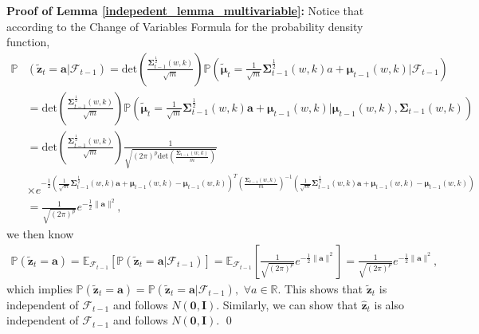 \noindent
\textbf{Proof of Lemma \ref{indepedent_lemma_multivariable}:}
    Notice that according to the Change of Variables Formula for the probability density function,
\begin{align*}
\mathbb{P}&(\widetilde{\bm{z}}_t=\bm{a}|\mathcal{F}_{t-1})=\text{det}\left(\frac{\bm{\Sigma}^{\frac{1}{2}}_{t-1}(w,k)}{\sqrt{m}}\right)\mathbb{P}\left(\widetilde{\bm{\mu}}_t =\frac{1}{\sqrt{m}}\bm{\Sigma}^{\frac{1}{2}}_{t-1}(w,k)a+\bm{\mu}_{t-1}(w,k)|\mathcal{F}_{t-1}\right)\\&= \text{det}\left(\frac{\bm{\Sigma}^{\frac{1}{2}}_{t-1}(w,k)}{\sqrt{m}}\right) \mathbb{P}\left(
\widetilde{\bm{\mu}}_t =\frac{1}{\sqrt{m}}\bm{\Sigma}^{\frac{1}{2}}_{t-1}(w,k)\bm a+\bm{\mu}_{t-1}(w,k)|\bm{\mu}_{t-1}(w,k),\bm{\Sigma}_{t-1}(w,k)
\right) \\&=\text{det}\left(\frac{\bm{\Sigma}^{\frac{1}{2}}_{t-1}(w,k)}{\sqrt{m}}\right)
\frac{1}{\sqrt
{{(2\pi)}^p \text{det}\left(\frac{\bm{\Sigma}_{t-1}(w,k)}{m}\right) }
} \\& \times e^{-\frac{1}{2}   ( \frac{1}{\sqrt{m}}\bm{\Sigma}^{\frac{1}{2}}_{t-1}(w,k)\bm a+\bm{\mu}_{t-1}(w,k)   -\bm{\mu}_{t-1}(w,k)   )^T {(\frac{\bm{\Sigma}_{t-1}(w,k)}{m})}^{-1} ( \frac{1}{\sqrt{m}}\bm{\Sigma}^{\frac{1}{2}}_{t-1}(w,k)\bm{a}+\bm{\mu}_{t-1}(w,k)   -\bm{\mu}_{t-1}(w,k)   )    } \\ & =\frac{1}{\sqrt{{(2\pi)}^p}}e^{-\frac{1}{2}\|\bm a\|^2},
\end{align*}
we then know 
\begin{align}
\mathbb{P}(\widetilde{\bm z}_t=\bm{a})=\mathbb{E}_{\mathcal{F}_{t-1}}\left[\mathbb{P}(\widetilde{\bm z}_t=\bm{a} | \mathcal{F}_{t-1})\right]=\mathbb{E}_{\mathcal{F}_{t-1}}\left[\frac{1}{\sqrt{{(2\pi)}^p}}e^{-\frac{1}{2}\|\bm{a}\|^2}\right]=\frac{1}{\sqrt{{(2\pi)}^p}}e^{-\frac{1}{2}\|\bm{a}\|^2},
\end{align}
which implies $\mathbb{P}(\widetilde{\bm z}_t=\bm a)=\mathbb{P}(\widetilde{\bm z}_t=\bm a|\mathcal{F}_{t-1}),$ $\forall a \in \mathbb{R}$. This shows that $\widetilde{\bm z}_t$ is independent of $\mathcal{F}_{t-1}$ and follows $N(\bm{0},\mathbf{I})$. Similarly, we can show that $\widehat{\bm z}_t$ is also independent of $\mathcal{F}_{t-1}$ and follows $N(\bm 0,\mathbf{I})$. \qed 

